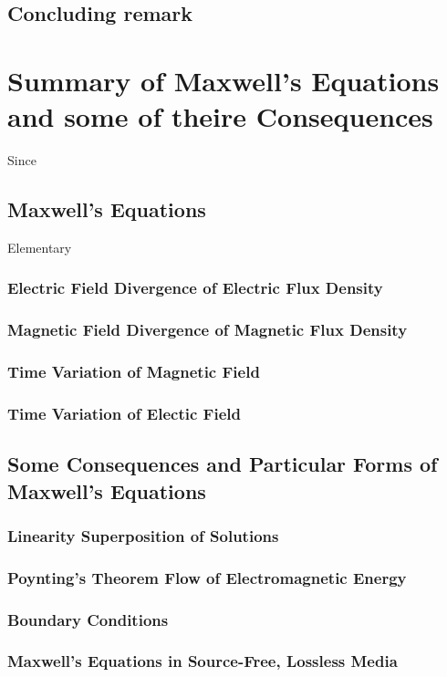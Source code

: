 \section{Concluding remark}

\chapter{Summary of Maxwell's Equations and some of theire Consequences}
Since

\section{Maxwell's Equations}
Elementary 
\subsection{Electric Field Divergence of Electric Flux Density}
\subsection{Magnetic Field Divergence of Magnetic Flux Density}
\subsection{Time Variation of Magnetic Field}
\subsection{Time Variation of Electic Field}

\section{Some Consequences and Particular Forms of Maxwell's Equations}
\subsection{Linearity Superposition of Solutions}
\subsection{Poynting's Theorem Flow of Electromagnetic Energy}
\subsection{Boundary Conditions}
\subsection{Maxwell's Equations in Source-Free, Lossless Media}
